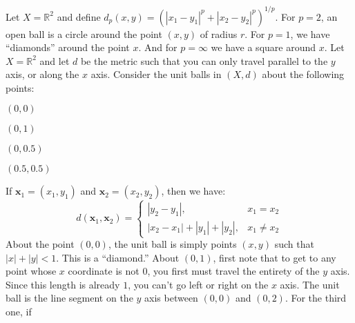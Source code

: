 \documentclass[crop=false,class=book,oneside]{standalone}
\begin{document}
            \begin{example}
                \label{EXAMPLE:FUNCTIONAL:UNIT_BALLS_EXAMPLE}
                Let $X=\mathbb{R}^{2}$ and define
                $d_{p}(x,y)%
                 =(|x_{1}-y_{1}|^{p}+|x_{2}-y_{2}|^{p})^{1/p}$.
                For $p=2$, an open ball is a circle around
                the point $(x,y)$ of radius $r$. For $p=1$,
                we have ``diamonds'' around the point $x$.
                And for $p=\infty$ we have a square
                around $x$.
                Let $X=\mathbb{R}^{2}$ and let $d$ be the metric
                such that you can only travel parallel to the
                $y$ axis, or along the $x$ axis.
                Consider the unit balls in $(X,d)$
                about the following points:
                \begin{enumerate}
                    \begin{multicols}{4}
                        \item $(0,0)$
                        \item $(0,1)$
                        \item $(0, 0.5)$
                        \item $(0.5,0.5)$
                    \end{multicols}
                \end{enumerate}
                If $\mathbf{x}_{1}=(x_{1},y_{1})$ and
                $\mathbf{x}_{2}=(x_{2},y_{2})$, then we have:
                \begin{equation*}
                    d(\mathbf{x}_{1},\mathbf{x}_{2})=
                    \begin{cases}
                        |y_{2}-y_{1}|,&x_{1}=x_{2}\\
                        |x_{2}-x_{1}|+|y_{1}|+|y_{2}|,
                        &x_{1}\ne{x_{2}}
                    \end{cases}
                \end{equation*}
            About the point $(0,0)$, the unit ball
            is simply points
            $(x,y)$ such that $|x|+|y|<1$. This is a ``diamond.''
            About $(0,1)$, first note that to get to any point
            whose $x$ coordinate is not $0$, you first must travel
            the entirety of the $y$ axis. Since this length is
            already $1$, you can't go left or right
            on the $x$ axis.
            The unit ball is the line segment on the $y$ axis
            between $(0,0)$ and $(0,2)$. For the third one, if

\end{example}
\end{document}
